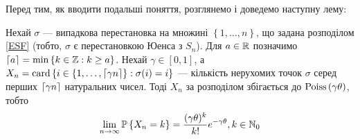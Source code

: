 Перед тим, як вводити подальші поняття, розглянемо і доведемо наступну лему:
\begin{lemma}\label{main_lemma}
    Нехай $\sigma$ --- випадкова перестановка на множині
    $\left\{1, \dots, n\right\}$, що задана розподілом \eqref{ESF}
    (тобто, $\sigma$ є перестановкою Юенса з $S_n$).
    Для $a \in \R$ позначимо $\ceil*{a} = \min\left\{k\in\Z : k \geq a\right\}$.
    Нехай $\gamma \in [0, 1]$, а
    $X_n = \card\left\{i\in \left\{1,\dots,\ceil*{\gamma n} \right\} : \sigma(i) = i\right\}$
    --- кількість нерухомих точок
    $\sigma$ серед перших $\ceil*{\g n}$ натуральних чисел.
    Тоді $X_n$ за розподілом збігається до $\Poiss{\gamma\theta}$, тобто
    \begin{gather}
        \lim_{n\to\infty} \P{X_n = k} = \frac{(\gamma\theta)^k}{k!}e^{-\gamma\theta}, k \in \N_0
    \end{gather} 
\end{lemma}
